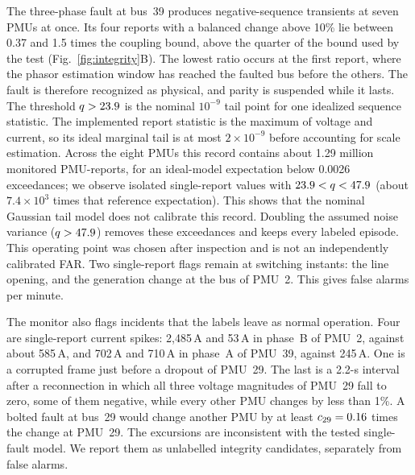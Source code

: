 The three-phase fault at bus~39 produces negative-sequence transients at
seven PMUs at once. Its four reports with a balanced change above 10\% lie
between 0.37 and 1.5 times the coupling bound, above the quarter of the
bound used by the test (Fig.~\ref{fig:integrity}B). The lowest ratio occurs
at the first report, where the phasor estimation window has reached the
faulted bus before the others. The fault is therefore recognized as
physical, and parity is suspended while it lasts.
The threshold $q>23.9$ is the nominal $10^{-9}$ tail point for one
idealized sequence statistic. The implemented report statistic is the
maximum of voltage and current, so its ideal marginal tail is at most
$2\times10^{-9}$ before accounting for scale estimation. Across the eight
PMUs this record contains about 1.29 million monitored PMU-reports, for an
ideal-model expectation below 0.0026 exceedances; we observe
\IntNoiseExceed{} isolated single-report values with
$23.9<q<47.9$ (about $7.4\times10^3$ times that reference
expectation). This
shows that the nominal Gaussian tail model does not calibrate this record.
Doubling the assumed noise variance ($q>47.9$) removes these
exceedances and keeps every labeled episode. This operating point was
chosen after inspection and is not an independently calibrated FAR.
Two single-report flags remain at switching instants: the line opening,
and the generation change at the bus of PMU~2. This gives
\IntSwitchRate{} false alarms per minute.

The monitor also flags \IntUnlabeled{} incidents that the labels leave as
normal operation. Four are single-report current spikes: 2{,}485\,A and
53\,A in phase~B of PMU~2, against about 585\,A, and 702\,A and 710\,A in
phase~A of PMU~39, against 245\,A. One is a corrupted frame just before a
dropout of PMU~29. The last is a 2.2-s interval after a reconnection in
which all three voltage magnitudes of PMU~29 fall to zero, some of them
negative, while every other PMU changes by less than 1\%. A bolted fault
at bus~29 would change another PMU by at least $c_{29}=0.16$
times the change at PMU~29. The excursions are inconsistent with the tested single-fault model.
We report them as unlabelled integrity candidates, separately from false alarms.

